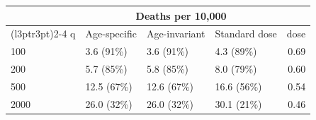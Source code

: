 
\begin{tabular}{llllr}
\toprule
\multicolumn{1}{c}{ } & \multicolumn{3}{c}{Deaths per 10,000} & \multicolumn{1}{c}{ } \\
\cmidrule(l{3pt}r{3pt}){2-4}
q & Age-specific & Age-invariant & Standard dose & dose\\
\midrule
100 & 3.6 (91\%) & 3.6 (91\%) & 4.3 (89\%) & 0.69\\
200 & 5.7 (85\%) & 5.8 (85\%) & 8.0 (79\%) & 0.60\\
500 & 12.5 (67\%) & 12.6 (67\%) & 16.6 (56\%) & 0.54\\
2000 & 26.0 (32\%) & 26.0 (32\%) & 30.1 (21\%) & 0.46\\
\bottomrule
\end{tabular}
